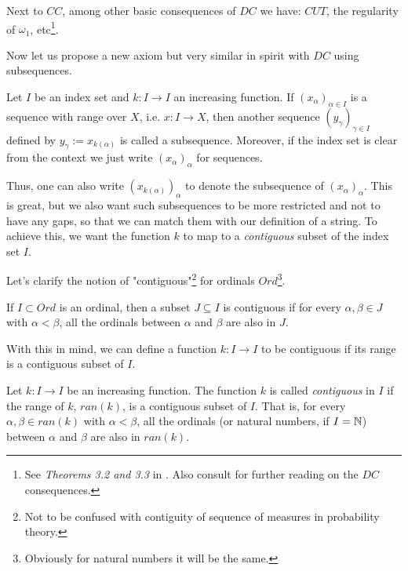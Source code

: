 Next to $CC$, among other basic consequences of $DC$ we have: $CUT$, the regularity of $\omega_1$, etc\footnote{See \textit{Theorems 3.2 and 3.3} in \cite{asper2020}. Also consult \cite{Jech1973AboutTA, Howard1998ConsequencesOT} for further reading on the $DC$ consequences.}.

Now let us propose a new axiom but very similar in spirit with $DC$ using subsequences.

\begin{definition}[Subsequence]\label{def_sub_seq}
  Let $I$ be an index set and $k: I \to I$ an increasing function. If $(x_\alpha)_{\alpha \in I}$ is a sequence with range over $X$, i.e. $x: I \to X$, then another sequence $(y_\gamma)_{\gamma \in I}$ defined by $y_\gamma := x_{k(\alpha)}$ is called a subsequence. Moreover, if the index set is clear from the context we just write $(x_{\alpha})_\alpha$ for sequences.
\end{definition}


Thus, one can also write $(x_{k(\alpha)})_{\alpha}$ to denote the subsequence of $(x_{\alpha})_{\alpha}$.  This is great, but we also want such subsequences to be more restricted and not to have any gaps, so that we can match them with our definition of a string. To achieve this, we want the function $k$ to map to a \textit{contiguous} subset of the index set $I$.

Let's clarify the notion of "contiguous"\footnote{Not to be confused with contiguity of sequence of measures in probability theory.} for ordinals $Ord$\footnote{Obviously for natural numbers it will be the same.}. 

\begin{definition}\label{def_ord_contg}
  If $I \subset Ord$ is an ordinal, then a subset $J \subseteq I$ is contiguous if for every $\alpha, \beta \in J$ with $\alpha < \beta$, all the ordinals between $\alpha$ and $\beta$ are also in $J$.
\end{definition}

With this in mind, we can define a function $k : I \to I$ to be contiguous if its range is a contiguous subset of $I$.

\begin{definition}\label{def_contg_fun}
Let $k: I \to I$ be an increasing function. The function $k$ is called \textit{contiguous} in $I$ if the range of $k$, $ran(k)$, is a contiguous subset of $I$. That is, for every $\alpha, \beta \in ran(k)$ with $\alpha < \beta$, all the ordinals (or natural numbers, if $I = \mathbb{N}$) between $\alpha$ and $\beta$ are also in $ran(k)$.
\end{definition}

